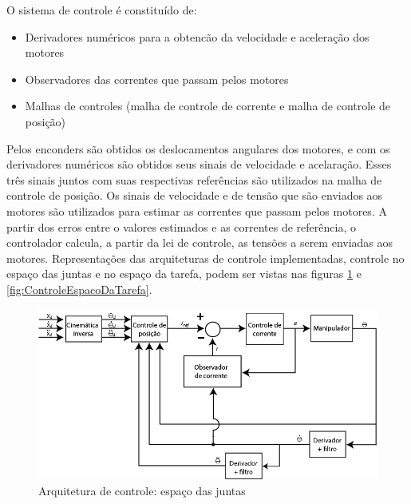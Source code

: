 \documentclass[]{politex}
\begin{document}
O sistema de controle é constituído de: 
\begin{itemize}
\item Derivadores numéricos para a obtencão da velocidade e aceleração dos motores
\item Observadores das correntes que passam pelos motores
\item Malhas de controles (malha de controle de corrente e malha de controle de posição) 
\end{itemize} 

Pelos enconders são obtidos os deslocamentos angulares dos motores, e com os derivadores numéricos são obtidos seus sinais de velocidade e acelaração. Esses três sinais juntos com suas respectivas referências são utilizados na malha de controle de posição. Os sinais de velocidade e de tensão que são enviados aos motores são utilizados para estimar as correntes que passam pelos motores. A partir dos erros entre o valores estimados e as correntes de referência, o controlador calcula, a partir da lei de controle, as tensões a serem enviadas aos motores. Representações das arquiteturas de controle implementadas, controle no espaço das juntas e no espaço da tarefa, podem ser vistas nas figuras \ref{fig:ControleEspacoDasJuntas} e \ref{fig:ControleEspacoDaTarefa}.

\begin{figure}[H]
    \centering
    \includegraphics[scale=0.5]{imagens/ControleEspacoDasJuntas.png}
    \caption{Arquitetura de controle: espaço das juntas}
    \label{fig:ControleEspacoDasJuntas}
\end{figure}
\end{document}
